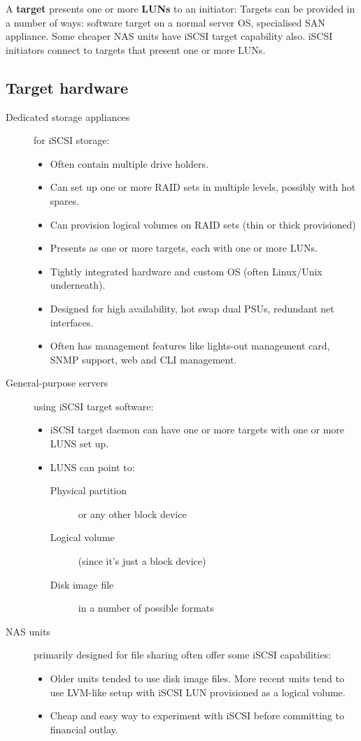 A \textbf{target} presents one or more \textbf{LUNs} to an initiator:
Targets can be provided in a number of ways: software target on a normal
server OS, specialised SAN appliance. Some cheaper NAS units have iSCSI
target capability also. iSCSI initiators connect to targets that present
one or more LUNs.

\subsection{Target hardware}
\label{sec:target-hardware}

\begin{description}
\item[Dedicated storage appliances]
for iSCSI storage:

\begin{itemize}
\item
  Often contain multiple drive holders.
\item
  Can set up one or more RAID sets in multiple levels, possibly with hot
  spares.
\item
  Can provision logical volumes on RAID sets (thin or thick provisioned)
\item
  Presents as one or more targets, each with one or more LUNs.
\item
  Tightly integrated hardware and custom OS (often Linux/Unix
  underneath).
\item
  Designed for high availability, hot swap dual PSUs, redundant net
  interfaces.
\item
  Often has management features like lights-out management card, SNMP
  support, web and CLI management.
\end{itemize}
\item[General-purpose servers]
using iSCSI target software:

\begin{itemize}
\item
  iSCSI target daemon can have one or more targets with one or more LUNS
  set up.
\item
  LUNS can point to:

  \begin{description}
  \item[Physical partition]
  or any other block device
  \item[Logical volume]
  (since it's just a block device)
  \item[Disk image file]
  in a number of possible formats
  \end{description}
\end{itemize}
\item[NAS units]
primarily designed for file sharing often offer some iSCSI capabilities:

\begin{itemize}
\item
  Older units tended to use disk image files. More recent units tend to
  use LVM-like setup with iSCSI LUN provisioned as a logical volume.
\item
  Cheap and easy way to experiment with iSCSI before committing to
  financial outlay.
\end{itemize}
\end{description}

